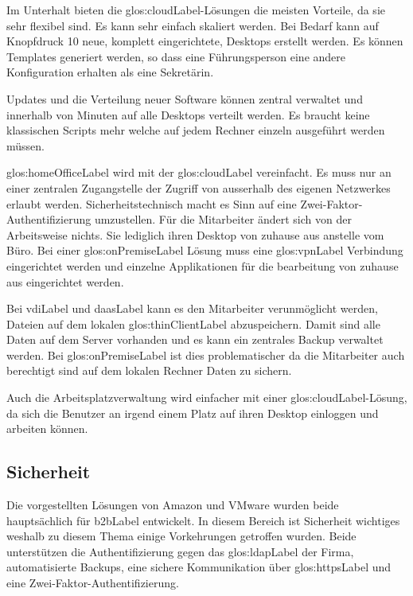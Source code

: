 Im Unterhalt bieten die \Gls{glos:cloudLabel}-Lösungen die meisten Vorteile, da sie sehr flexibel sind. Es kann sehr einfach skaliert werden. Bei Bedarf kann auf Knopfdruck 10 neue, komplett eingerichtete,  Desktops erstellt werden. Es können Templates generiert werden, so dass eine Führungsperson eine andere Konfiguration erhalten als eine Sekretärin.

Updates und die Verteilung neuer Software können zentral verwaltet und innerhalb von Minuten auf alle Desktops verteilt werden. Es braucht keine klassischen Scripts mehr welche auf jedem Rechner einzeln ausgeführt werden müssen.

\gls{glos:homeOfficeLabel} wird mit der \Gls{glos:cloudLabel} vereinfacht. Es muss nur an einer zentralen Zugangstelle der Zugriff von ausserhalb des eigenen Netzwerkes erlaubt werden. Sicherheitstechnisch macht es Sinn auf eine Zwei-Faktor-Authentifizierung umzustellen. Für die Mitarbeiter ändert sich von der Arbeitsweise nichts. Sie lediglich ihren Desktop von zuhause aus anstelle vom Büro. Bei einer \gls{glos:onPremiseLabel} Lösung muss eine \gls{glos:vpnLabel} Verbindung eingerichtet werden und einzelne Applikationen für die bearbeitung von zuhause aus eingerichtet werden.

Bei \Gls{vdiLabel} und \Gls{daasLabel} kann es den Mitarbeiter verunmöglicht werden, Dateien auf dem lokalen \gls{glos:thinClientLabel} abzuspeichern. Damit sind alle Daten auf dem Server vorhanden und es kann ein zentrales Backup verwaltet werden. Bei \gls{glos:onPremiseLabel} ist dies problematischer da die Mitarbeiter auch berechtigt sind auf dem lokalen Rechner Daten zu sichern.

Auch die Arbeitsplatzverwaltung wird einfacher mit einer \Gls{glos:cloudLabel}-Lösung, da sich die Benutzer an irgend einem Platz auf ihren Desktop einloggen und arbeiten können.

\subsection{Sicherheit}
Die vorgestellten Lösungen von Amazon und VMware wurden beide hauptsächlich für \Gls{b2bLabel} entwickelt. In diesem Bereich ist Sicherheit wichtiges weshalb zu diesem Thema einige Vorkehrungen getroffen wurden. Beide unterstützen die Authentifizierung gegen das \gls{glos:ldapLabel} der Firma, automatisierte Backups, eine sichere Kommunikation über \gls{glos:httpsLabel} und eine Zwei-Faktor-Authentifizierung.

